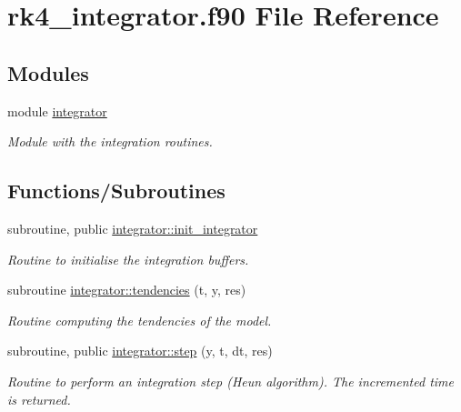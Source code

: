 \hypertarget{rk4__integrator_8f90}{}\section{rk4\+\_\+integrator.\+f90 File Reference}
\label{rk4__integrator_8f90}
\subsection*{Modules}
\begin{DoxyCompactItemize}
\item 
module \hyperlink{namespaceintegrator}{integrator}
\begin{DoxyCompactList}\small\item\em Module with the integration routines. \end{DoxyCompactList}\end{DoxyCompactItemize}
\subsection*{Functions/\+Subroutines}
\begin{DoxyCompactItemize}
\item 
subroutine, public \hyperlink{namespaceintegrator_ab01b1930fc627150051ed5c5465ac533}{integrator\+::init\+\_\+integrator}
\begin{DoxyCompactList}\small\item\em Routine to initialise the integration buffers. \end{DoxyCompactList}\item 
subroutine \hyperlink{namespaceintegrator_ae8158ec5bb2be4dca1daadb1a906ba96}{integrator\+::tendencies} (t, y, res)
\begin{DoxyCompactList}\small\item\em Routine computing the tendencies of the model. \end{DoxyCompactList}\item 
subroutine, public \hyperlink{namespaceintegrator_adaf5baacd0ff1905f334ce824cdcd58e}{integrator\+::step} (y, t, dt, res)
\begin{DoxyCompactList}\small\item\em Routine to perform an integration step (Heun algorithm). The incremented time is returned. \end{DoxyCompactList}\end{DoxyCompactItemize}
